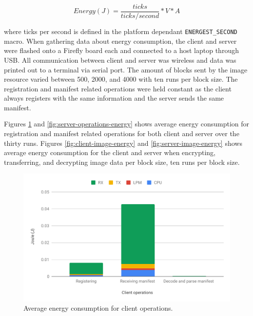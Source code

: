 \documentclass[0-thesis.tex]{subfiles}
\begin{document}
$$ Energy (J) = \frac{ticks}{ticks/second} * V * A $$

where ticks per second is defined in the platform dependant \texttt{ENERGEST\_SECOND}
macro. When gathering data about energy consumption, the client and server were flashed
onto a Firefly board each and connected to a host laptop through USB. All communication
between client and server was wireless and data was printed out to a terminal via serial
port. The amount of blocks sent by the image resource varied between 500, 2000, and 4000
with ten runs per block size. The registration and manifest related operations were held
constant as the client always registers with the same information and the server sends the
same manifest. 

Figures \ref{fig:client-operations-energy} and \ref{fig:server-operations-energy} shows
average energy consumption for registration and manifest related operations for both
client and server over the thirty runs. Figures \ref{fig:client-image-energy} and
\ref{fig:server-image-energy} shows average energy consumption for the client and server
when encrypting, transferring, and decrypting image data per block size, ten runs per
block size. 

\begin{figure}[h!]
    \caption{Average energy consumption for client operations.}
    \label{fig:client-operations-energy}
    \includegraphics[scale=0.65]{images/client-operations-energy.pdf}
\end{figure}
\end{document}
